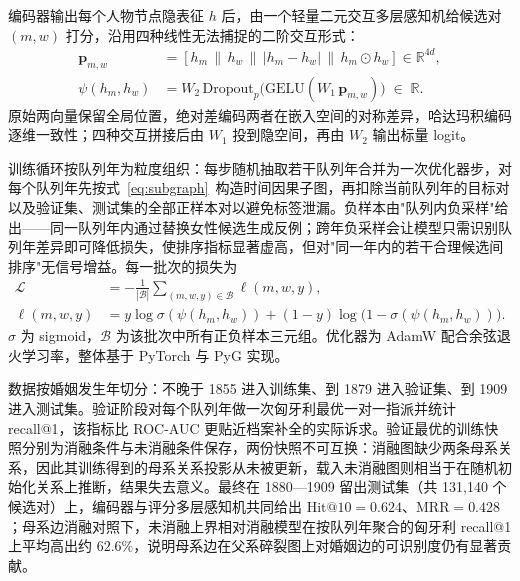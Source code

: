编码器输出每个人物节点隐表征 \(h\) 后，由一个轻量二元交互多层感知机给候选对 \((m,w)\) 打分，沿用四种线性无法捕捉的二阶交互形式\citep{vaswani2017attention}：
\begin{equation}\label{eq:scorer}
\begin{aligned}
  \mathbf{p}_{m,w} &= [h_m \,\|\, h_w \,\|\, |h_m-h_w| \,\|\, h_m\odot h_w]\in\mathbb{R}^{4d}, \\
  \psi(h_m,h_w) &= W_2\,\mathrm{Dropout}_p\bigl(\mathrm{GELU}(W_1\,\mathbf{p}_{m,w})\bigr)\;\in\;\mathbb{R}.
\end{aligned}
\end{equation}
原始两向量保留全局位置，绝对差编码两者在嵌入空间的对称差异，哈达玛积编码逐维一致性；四种交互拼接后由 \(W_1\) 投到隐空间，再由 \(W_2\) 输出标量 logit。

训练循环按队列年为粒度组织：每步随机抽取若干队列年合并为一次优化器步，对每个队列年先按式~\eqref{eq:subgraph}~构造时间因果子图，再扣除当前队列年的目标对以及验证集、测试集的全部正样本对以避免标签泄漏。负样本由"队列内负采样"给出——同一队列年内通过替换女性候选生成反例；跨年负采样会让模型只需识别队列年差异即可降低损失，使排序指标显著虚高，但对"同一年内的若干合理候选间排序"无信号增益。每一批次的损失为
\begin{equation}\label{eq:loss}
\begin{aligned}
  \mathcal{L} &= -\frac{1}{|\mathcal{B}|}\sum_{(m,w,y)\in\mathcal{B}}\ell(m,w,y), \\
  \ell(m,w,y) &= y\log\sigma(\psi(h_m,h_w)) + (1-y)\log\bigl(1-\sigma(\psi(h_m,h_w))\bigr).
\end{aligned}
\end{equation}
\(\sigma\) 为 sigmoid，\(\mathcal{B}\) 为该批次中所有正负样本三元组。优化器为 AdamW 配合余弦退火学习率，整体基于 PyTorch\citep{paszke2019pytorch} 与 PyG\citep{fey2019pyg} 实现。

数据按婚姻发生年切分：不晚于 1855 进入训练集、到 1879 进入验证集、到 1909 进入测试集。验证阶段对每个队列年做一次匈牙利最优一对一指派并统计 recall@1，该指标比 ROC-AUC 更贴近档案补全的实际诉求。验证最优的训练快照分别为消融条件与未消融条件保存，两份快照不可互换：消融图缺少两条母系关系，因此其训练得到的母系关系投影从未被更新，载入未消融图则相当于在随机初始化关系上推断，结果失去意义。最终在 1880—1909 留出测试集（共 131{,}140 个候选对）上，编码器与评分多层感知机共同给出 \(\mathrm{Hit@10}=0.624\)、\(\mathrm{MRR}=0.428\)；母系边消融对照下，未消融上界相对消融模型在按队列年聚合的匈牙利 recall@1 上平均高出约 \(62.6\%\)，说明母系边在父系碎裂图上对婚姻边的可识别度仍有显著贡献。

